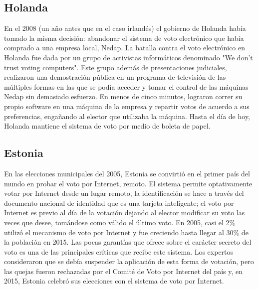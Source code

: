 \subsection{Holanda}
En el 2008 (un año antes que en el caso irlandés) el gobierno de Holanda había tomado la misma decisión: abandonar el sistema de voto electrónico que había comprado a una empresa local, Nedap. La batalla contra el voto electrónico en Holanda fue dada por un grupo de activistas informáticos denominado "We don't trust voting computers". Este grupo además de presentaciones judiciales, realizaron una demostración pública en un programa de televisión de las múltiples formas en las que se podía acceder y tomar el control de las máquinas Nedap sin demasiado esfuerzo. En menos de cinco minutos, lograron correr su propio software en una máquina de la empresa y repartir votos de acuerdo a sus preferencias, engañando al elector que utilizaba la máquina. Hasta el día de hoy, Holanda mantiene el sistema de voto por medio de boleta de papel.\cite{netherlands}

\subsection{Estonia}
En las elecciones municipales del 2005, Estonia se convirtió en el primer país del mundo en probar el voto por Internet, remoto. El sistema permite optativamente votar por Internet desde un lugar remoto, la identificación se hace a través del documento nacional de identidad que es una tarjeta inteligente; el voto por Internet es previo al día de la votación dejando al elector modificar su voto las veces que desee, tomándose como válido el último voto. En 2005, casi el 2\% utilizó el mecanismo de voto por Internet y fue creciendo hasta llegar al 30\% de la población en 2015. Las pocas garantías que ofrece sobre el carácter secreto del voto es una de las principales críticas que recibe este sistema. Los expertos consideraron que se debía suspender la aplicación de esta forma de votación, pero las quejas fueron rechazadas por el Comité de Voto por Internet del país y, en 2015, Estonia celebró sus elecciones con el sistema de voto por Internet.\cite{vassil2016diffusion}


